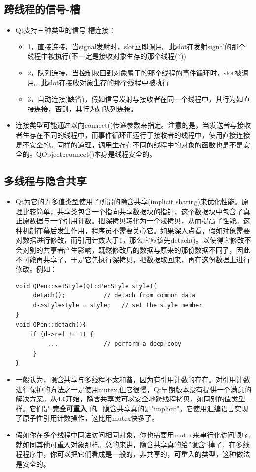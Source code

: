 \documentclass[9pt,b5paper]{article}
\begin{document}
\subsection{跨线程的信号-槽}
\label{sec-2-4}
\begin{itemize}
\item Qt支持三种类型的信号-槽连接：
\begin{itemize}
\item 1，直接连接，当signal发射时，slot立即调用。此slot在发射signal的那个线程中被执行(不一定是接收对象生存的那个线程(?))
\item 2，队列连接，当控制权回到对象属于的那个线程的事件循环时，slot被调用。此slot在接收对象生存的那个线程中被执行
\item 3，自动连接(缺省)，假如信号发射与接收者在同一个线程中，其行为如直接连接，否则，其行为如队列连接。
\end{itemize}
\item 连接类型可能通过以向connect()传递参数来指定。注意的是，当发送者与接收者生存在不同的线程中，而事件循环正运行于接收者的线程中，使用直接连接是不安全的。同样的道理，调用生存在不同的线程中的对象的函数也是不是安全的。QObject::connect()本身是线程安全的。
\end{itemize}
\subsection{多线程与隐含共享}
\label{sec-2-5}
\begin{itemize}
\item Qt为它的许多值类型使用了所谓的隐含共享(implicit sharing)来优化性能。原理比较简单，共享类包含一个指向共享数据块的指针，这个数据块中包含了真正原数据与一个引用计数。把深拷贝转化为一个浅拷贝，从而提高了性能。这种机制在幕后发生作用，程序员不需要关心它。如果深入点看，假如对象需要对数据进行修改，而引用计数大于1，那么它应该先detach()。以使得它修改不会对别的共享者产生影响，既然修改后的数据与原来的那份数据不同了，因此不可能再共享了，于是它先执行深拷贝，把数据取回来，再在这份数据上进行修改。例如：

\lstset{language=java,label= ,caption= ,numbers=none}
\begin{lstlisting}
void QPen::setStyle(Qt::PenStyle style){  
     detach();           // detach from common data  
     d->stylestyle = style;   // set the style member  
}  
void QPen::detach(){   
    if (d->ref != 1) {  
         ...             // perform a deep copy  
     }  
}
\end{lstlisting}
\item 一般认为，隐含共享与多线程不太和谐，因为有引用计数的存在。对引用计数进行保护的方法之一是使用mutex,但它很慢，Qt早期版本没有提供一个满意的解决方案。从4.0开始，隐含共享类可以安全地跨线程拷贝，如同别的值类型一样。它们是 \textbf{完全可重入} 的。隐含共享真的是"implicit"。它使用汇编语言实现了原子性引用计数操作，这比用mutex快多了。
\item 假如你在多个线程中同进访问相同对象，你也需要用mutex来串行化访问顺序,就如同其他可重入对象那样。总的来讲，隐含共享真的给”隐含“掉了，在多线程程序中，你可以把它们看成是一般的，非共享的，可重入的类型，这种做法是安全的。
\end{itemize}
\end{document}
